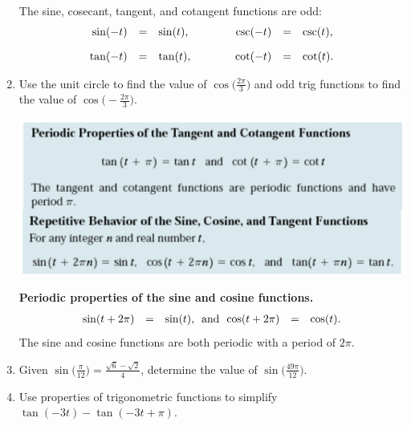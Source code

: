 \begin{enumerate}
{{     The sine, cosecant, tangent, and cotangent functions are odd:
     \begin{eqnarray*}
       \begin{array}{rcl@{\hspace{4em}}rcl}
         \sin(-t) & = & \sin(t), & \csc(-t) & = & \csc(t),\\ [10pt]
         \tan(-t) & = & \tan(t), & \cot(-t) & = & \cot(t).
       \end{array}
     \end{eqnarray*}

   }
 }


\item Use the unit circle to find the value of
  $\displaystyle \cos \Bigg(\frac{2\pi}{3}\Bigg)$ and odd trig
  functions to find the value of
  $\displaystyle \cos \Bigg(-\frac{2\pi}{3}\Bigg)$.

\vfill

\includegraphics[scale=.6]{periodic}\\

   \noindent\colorbox{blue!10}{%
   \parbox{\dimexpr\linewidth}%
   {%
     \textbf{Periodic properties of the sine and cosine functions.}
     \begin{eqnarray*}
       \begin{array}{rcl@{~~\textrm{and}~~}rcl}
         \sin(t+2\pi) & = & \sin(t), & \cos(t+2\pi) & = & \cos(t).
       \end{array}
     \end{eqnarray*}
     The sine and cosine functions are both periodic with a period of $2\pi$.
   }
 }


\newpage
\item Given $\displaystyle \sin\Bigg(\frac{\pi}{12}\Bigg)=\frac{\sqrt{6}-\sqrt{2}}{4}$, determine the value of $\displaystyle \sin \Bigg( \frac{49\pi}{12} \Bigg)$.

\vfill
\item Use properties of trigonometric functions to simplify $\tan(-3t)-\tan(-3t+\pi)$.
\vfill


\end{enumerate}
